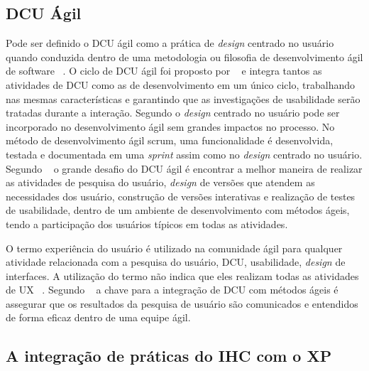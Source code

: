 \subsection{DCU Ágil}

Pode ser definido o DCU ágil como a prática de \emph{design} centrado no usuário quando conduzida dentro de uma metodologia ou filosofia de desenvolvimento ágil de software ~\cite{santos2012}. 
%
O ciclo de DCU ágil foi proposto por ~ e integra tantos as atividades de DCU como as de desenvolvimento em um único ciclo, trabalhando nas mesmas características e garantindo que as investigações de usabilidade serão tratadas durante a interação.
%
Segundo  o \emph{design} centrado no usuário pode ser incorporado no desenvolvimento ágil sem grandes impactos no processo. No método de desenvolvimento ágil scrum, uma funcionalidade é desenvolvida, testada e documentada em uma \textit{sprint} assim como no \emph{design} centrado no usuário. 
%	
Segundo ~ o grande desafio do DCU ágil é encontrar a melhor maneira de realizar as atividades de pesquisa do usuário, \emph{design} de versões que atendem as necessidades dos usuário, construção de versões interativas e realização de testes de usabilidade, dentro de um ambiente de desenvolvimento com métodos ágeis, tendo a participação dos usuários típicos em todas as atividades.


O termo experiência do usuário é utilizado na comunidade ágil para qualquer atividade relacionada com a pesquisa do usuário, DCU, usabilidade, \emph{design} de interfaces. A utilização do termo não indica que eles realizam todas as atividades de UX ~\cite{santos2012}.
%
Segundo ~ a chave para a integração de DCU com métodos ágeis é assegurar que os resultados da pesquisa de usuário são comunicados e entendidos de forma eficaz dentro de uma equipe ágil.


\subsection{A integração de práticas do IHC com o XP}

